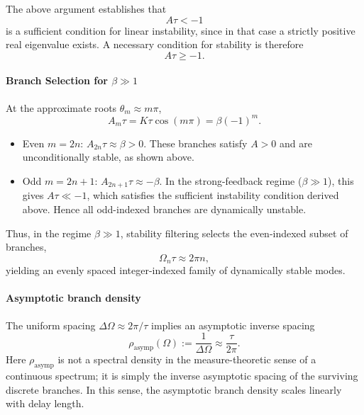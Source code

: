 \documentclass[11pt,a4paper]{article}
\begin{document}
            The above argument establishes that
            \begin{equation}
                A\tau<-1
            \end{equation}
            is a sufficient condition for linear instability, since in that case a strictly positive real eigenvalue exists.
            A necessary condition for stability is therefore
            \begin{equation}
                A\tau\ge -1.
            \end{equation}

        \paragraph{Branch Selection for \texorpdfstring{$\beta\gg1$}{beta>>1}}

            At the approximate roots $\theta_m\approx m\pi$,
            \begin{equation}
                A_m\tau = K\tau\cos(m\pi) = \beta(-1)^m.
            \end{equation}

            \begin{itemize}
                \item Even $m=2n$: $A_{2n}\tau\approx\beta>0$.
                These branches satisfy $A>0$ and are unconditionally stable, as shown above.

                \item Odd $m=2n+1$: $A_{2n+1}\tau\approx-\beta$.
                In the strong-feedback regime ($\beta\gg1$), this gives $A\tau\ll-1$, which satisfies the sufficient instability condition derived above.
                Hence all odd-indexed branches are dynamically unstable.
            \end{itemize}

            Thus, in the regime $\beta\gg1$, stability filtering selects the even-indexed subset of branches,
            \begin{equation}
                \Omega_n\tau\approx2\pi n,
            \end{equation}
            yielding an evenly spaced integer-indexed family of dynamically stable modes.

    \paragraph{Asymptotic branch density}

        The uniform spacing $\Delta\Omega\approx2\pi/\tau$ implies an asymptotic inverse spacing
        \begin{equation}
            \rho_{\mathrm{asymp}}(\Omega):=\frac{1}{\Delta\Omega}\approx\frac{\tau}{2\pi}.
        \end{equation}
        Here $\rho_{\mathrm{asymp}}$ is not a spectral density in the measure-theoretic sense of a continuous spectrum; it is simply the inverse asymptotic spacing of the surviving discrete branches. In this sense, the asymptotic branch density scales linearly with delay length.
\end{document}
